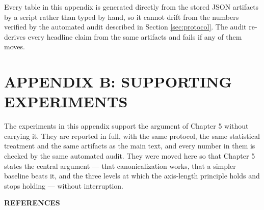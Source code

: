\documentclass[12pt,a4paper]{report}
\begin{document}
Every table in this appendix is generated directly from the stored JSON artifacts by a script rather than typed by hand, so it cannot drift from the numbers verified by the automated audit described in Section \ref{sec:protocol}. The audit re-derives every headline claim from the same artifacts and fails if any of them moves.



\chapter*{APPENDIX B: SUPPORTING EXPERIMENTS}

The experiments in this appendix support the argument of Chapter 5 without carrying it. They are reported in full, with the same protocol, the same statistical treatment and the same artifacts as the main text, and every number in them is checked by the same automated audit. They were moved here so that Chapter 5 states the central argument --- that canonicalization works, that a simpler baseline beats it, and the three levels at which the axis-length principle holds and stops holding --- without interruption.

\setcounter{section}{0}
\renewcommand{\thesection}{B.\arabic{section}}




\newpage
{}
{}
\begin{center}
{\fontsize{14}{17}\bfseries REFERENCES}
\end{center}
\vspace{0.5cm}
\end{document}
